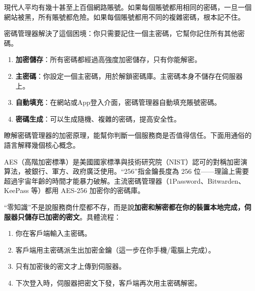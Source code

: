 


現代人平均有幾十甚至上百個網路賬號。如果每個賬號都用相同的密碼，一旦一個網站被黑，所有賬號都危險。如果每個賬號都用不同的複雜密碼，根本記不住。

密碼管理器解決了這個困境：你只需要記住一個主密碼，它幫你記住所有其他密碼。


\begin{enumerate}
  \item \textbf{加密儲存}：所有密碼都經過高強度加密儲存，只有你能解密。
  \item \textbf{主密碼}：你設定一個主密碼，用於解鎖密碼庫。主密碼本身不儲存在伺服器上。
  \item \textbf{自動填充}：在網站或App登入介面，密碼管理器自動填充賬號密碼。
  \item \textbf{密碼生成}：可以生成隨機、複雜的密碼，提高安全性。
\end{enumerate}


瞭解密碼管理器的加密原理，能幫你判斷一個服務商是否值得信任。下面用通俗的語言解釋幾個核心概念。


AES（高階加密標準）是美國國家標準與技術研究院（NIST）認可的對稱加密演算法，被銀行、軍方、政府廣泛使用。“256”指金鑰長度為 256 位——理論上需要超過宇宙年齡的時間才能暴力破解。主流密碼管理器（1Password、Bitwarden、KeePass 等）都用 AES-256 加密你的密碼庫。


“零知識”不是說服務商什麼都不存，而是說\textbf{加密和解密都在你的裝置本地完成，伺服器只儲存已加密的密文}。具體流程：

\begin{enumerate}
  \item 你在客戶端輸入主密碼。
  \item 客戶端用主密碼派生出加密金鑰（這一步在你手機/電腦上完成）。
  \item 只有加密後的密文才上傳到伺服器。
  \item 下次登入時，伺服器把密文下發，客戶端再次用主密碼解密。
\end{enumerate}

